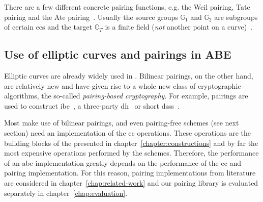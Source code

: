 There are a few different concrete pairing functions, e.g. the Weil pairing, Tate pairing and the Ate pairing~\cite{kiraz_still_2016}.
Usually the source groups $\mathbb{G}_1$ and $\mathbb{G}_2$ are subgroups of certain \glspl{ec} \cite{kiraz_still_2016} and the target $\mathbb{G}_T$ is a finite field (\emph{not} another point on a curve)~\cite{blake_advances_2005}.

\subsection{Use of elliptic curves and pairings in ABE}
Elliptic curves are already widely used in .
Bilinear pairings, on the other hand, are relatively new and have given rise to a whole new class of cryptographic algorithms, the so-called \emph{pairing-based cryptography}.
For example, pairings are used to construct \gls{ibe}~\cite{boneh_identity-based_2001}, a three-party \gls{dh}~\cite{joux_one_2000} or short \glspl{dss}~\cite{boneh_short_2001}.

Most  make use of bilinear pairings, and even pairing-free schemes (see next section) need an implementation of the \gls{ec} operations.
These operations are the building blocks of the  presented in chapter~\ref{chapter:constructions} and by far the most expensive operations performed by the schemes.
Therefore, the performance of an \acrshort{abe} implementation greatly depends on the performance of the \gls{ec} and pairing implementation.
For this reason, pairing implementations from literature are considered in chapter~\ref{chap:related-work} and our pairing library is evaluated separately in chapter~\ref{chap:evaluation}.